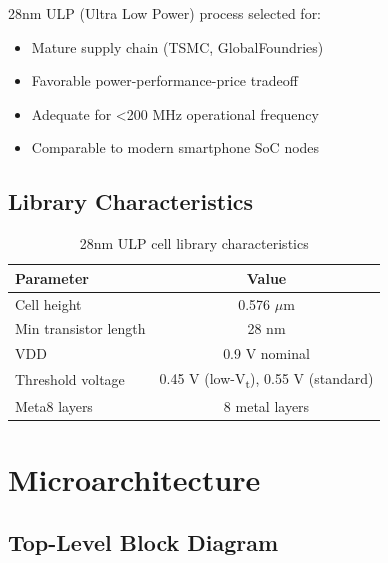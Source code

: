 28nm ULP (Ultra Low Power) process selected for:

\begin{itemize}
    \item Mature supply chain (TSMC, GlobalFoundries)
    \item Favorable power-performance-price tradeoff
    \item Adequate for <200 MHz operational frequency
    \item Comparable to modern smartphone SoC nodes
\end{itemize}

\subsection{Library Characteristics}

\begin{table}[h]
    \centering
    \caption{28nm ULP cell library characteristics}
    \label{tab:lib_chars}
    \begin{tabular}{lc}
        \toprule
        \textbf{Parameter} & \textbf{Value} \\
        \midrule
        Cell height & 0.576 $\mu$m \\
        Min transistor length & 28 nm \\
        VDD & 0.9 V nominal \\
        Threshold voltage & 0.45 V (low-V\textsubscript{t}), 0.55 V (standard) \\
        Meta8 layers & 8 metal layers \\
        \bottomrule
    \end{tabular}
\end{table}

\section{Microarchitecture}

\subsection{Top-Level Block Diagram}

